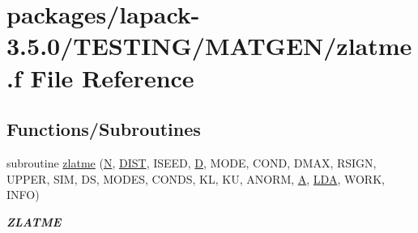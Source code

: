 \hypertarget{zlatme_8f}{}\section{packages/lapack-\/3.5.0/\+T\+E\+S\+T\+I\+N\+G/\+M\+A\+T\+G\+E\+N/zlatme.f File Reference}
\label{zlatme_8f}
\subsection*{Functions/\+Subroutines}
\begin{DoxyCompactItemize}
\item 
subroutine \hyperlink{group__complex16__matgen_gae773f8419cc26a6c84f41d7c3bbe2eb2}{zlatme} (\hyperlink{polmisc_8c_a0240ac851181b84ac374872dc5434ee4}{N}, \hyperlink{superlu__enum__consts_8h_af00a42ecad444bbda75cde1b64bd7e72ac04fbbdf0d80a4ad25e565541deeebd7}{D\+I\+S\+T}, I\+S\+E\+E\+D, \hyperlink{odrpack_8h_a7dae6ea403d00f3687f24a874e67d139}{D}, M\+O\+D\+E, C\+O\+N\+D, D\+M\+A\+X, R\+S\+I\+G\+N, U\+P\+P\+E\+R, S\+I\+M, D\+S, M\+O\+D\+E\+S, C\+O\+N\+D\+S, K\+L, K\+U, A\+N\+O\+R\+M, \hyperlink{classA}{A}, \hyperlink{example__user_8c_ae946da542ce0db94dced19b2ecefd1aa}{L\+D\+A}, W\+O\+R\+K, I\+N\+F\+O)
\begin{DoxyCompactList}\small\item\em {\bfseries Z\+L\+A\+T\+M\+E} \end{DoxyCompactList}\end{DoxyCompactItemize}
